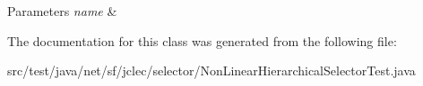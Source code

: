 \begin{DoxyParams}{Parameters}
{\em name} & \\
\hline
\end{DoxyParams}


The documentation for this class was generated from the following file\-:\begin{DoxyCompactItemize}
\item 
src/test/java/net/sf/jclec/selector/Non\-Linear\-Hierarchical\-Selector\-Test.\-java\end{DoxyCompactItemize}
